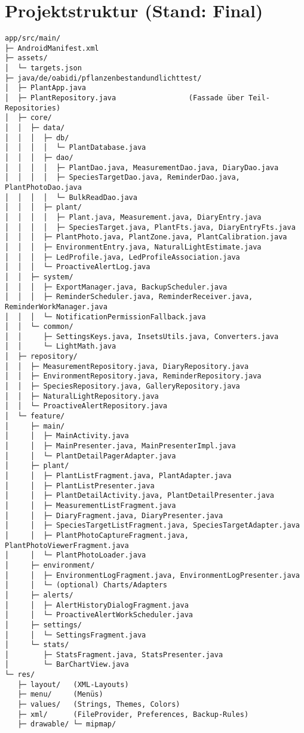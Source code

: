 \documentclass[14pt,a4paper]{report}
\begin{document}
\section{Projektstruktur (Stand: Final)}
\begin{verbatim}
app/src/main/
├─ AndroidManifest.xml
├─ assets/
│  └─ targets.json
├─ java/de/oabidi/pflanzenbestandundlichttest/
│  ├─ PlantApp.java
│  ├─ PlantRepository.java                 (Fassade über Teil-Repositories)
│  ├─ core/
│  │  ├─ data/
│  │  │  ├─ db/
│  │  │  │  └─ PlantDatabase.java
│  │  │  ├─ dao/
│  │  │  │  ├─ PlantDao.java, MeasurementDao.java, DiaryDao.java
│  │  │  │  ├─ SpeciesTargetDao.java, ReminderDao.java, PlantPhotoDao.java
│  │  │  │  └─ BulkReadDao.java
│  │  │  ├─ plant/
│  │  │  │  ├─ Plant.java, Measurement.java, DiaryEntry.java
│  │  │  │  ├─ SpeciesTarget.java, PlantFts.java, DiaryEntryFts.java
│  │  │  ├─ PlantPhoto.java, PlantZone.java, PlantCalibration.java
│  │  │  ├─ EnvironmentEntry.java, NaturalLightEstimate.java
│  │  │  ├─ LedProfile.java, LedProfileAssociation.java
│  │  │  └─ ProactiveAlertLog.java
│  │  ├─ system/
│  │  │  ├─ ExportManager.java, BackupScheduler.java
│  │  │  ├─ ReminderScheduler.java, ReminderReceiver.java, ReminderWorkManager.java
│  │  │  └─ NotificationPermissionFallback.java
│  │  └─ common/
│  │     ├─ SettingsKeys.java, InsetsUtils.java, Converters.java
│  │     └─ LightMath.java
│  ├─ repository/
│  │  ├─ MeasurementRepository.java, DiaryRepository.java
│  │  ├─ EnvironmentRepository.java, ReminderRepository.java
│  │  ├─ SpeciesRepository.java, GalleryRepository.java
│  │  ├─ NaturalLightRepository.java
│  │  └─ ProactiveAlertRepository.java
│  └─ feature/
│     ├─ main/
│     │  ├─ MainActivity.java
│     │  ├─ MainPresenter.java, MainPresenterImpl.java
│     │  └─ PlantDetailPagerAdapter.java
│     ├─ plant/
│     │  ├─ PlantListFragment.java, PlantAdapter.java
│     │  ├─ PlantListPresenter.java
│     │  ├─ PlantDetailActivity.java, PlantDetailPresenter.java
│     │  ├─ MeasurementListFragment.java
│     │  ├─ DiaryFragment.java, DiaryPresenter.java
│     │  ├─ SpeciesTargetListFragment.java, SpeciesTargetAdapter.java
│     │  ├─ PlantPhotoCaptureFragment.java, PlantPhotoViewerFragment.java
│     │  └─ PlantPhotoLoader.java
│     ├─ environment/
│     │  ├─ EnvironmentLogFragment.java, EnvironmentLogPresenter.java
│     │  └─ (optional) Charts/Adapters
│     ├─ alerts/
│     │  ├─ AlertHistoryDialogFragment.java
│     │  └─ ProactiveAlertWorkScheduler.java
│     ├─ settings/
│     │  └─ SettingsFragment.java
│     └─ stats/
│        ├─ StatsFragment.java, StatsPresenter.java
│        └─ BarChartView.java
└─ res/
   ├─ layout/   (XML-Layouts)
   ├─ menu/     (Menüs)
   ├─ values/   (Strings, Themes, Colors)
   ├─ xml/      (FileProvider, Preferences, Backup-Rules)
   ├─ drawable/ └─ mipmap/
\end{verbatim}
\end{document}
